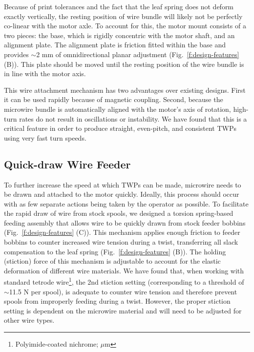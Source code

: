 \documentclass[11pt,a4paper]{article}
\begin{document}
Because of print tolerances and the fact that the leaf spring does not deform
exactly vertically, the resting position of wire bundle will likely not be
perfectly co-linear with the motor axle. To account for this, the motor mount
consists of a two pieces: the base, which is rigidly concentric with the motor
shaft, and an alignment plate. The alignment plate is friction fitted within
the base and provides $\sim$2 mm of omnidirectional planar adjustment
(Fig.~\ref{f:design-features} (B)). This plate should be moved until the
resting position of the wire bundle is in line with the motor axis.

This wire attachment mechanism has two advantages over existing designs. First
it can be used rapidly because of magnetic coupling. Second, because the
microwire bundle is automatically aligned with the motor's axis of rotation,
high-turn rates do not result in oscillations or instability. We have found
that this is a critical feature in order to produce straight, even-pitch, and
consistent TWPs using very fast turn speeds.

\subsection{Quick-draw Wire Feeder}
To further increase the speed at which TWPs can be made, microwire needs to be
drawn and attached to the motor quickly. Ideally, this process should occur
with as few separate actions being taken by the operator as possible. To
facilitate the rapid draw of wire from stock spools, we designed a torsion
spring-based feeding assembly that allows wire to be quickly drawn from stock
feeder bobbins (Fig.~\ref{f:design-features} (C)). This mechanism applies
enough friction to feeder bobbins to counter increased wire tension during a
twist, transferring all slack compensation to the leaf spring
(Fig.~\ref{f:design-features} (B)). The holding (stiction) force of this
mechanism is adjustable to account for the elastic deformation of different
wire materials. We have found that, when working with standard tetrode
wire\footnote{Polyimide-coated nichrome; $\mu$m}, the 2nd stiction
setting (corresponding to a threshold of $\sim$11.5 N per spool), is adequate
to counter wire tension and therefore prevent spools from improperly feeding
during a twist. However, the proper stiction setting is dependent on the
microwire material and will need to be adjusted for other wire types.
\end{document}
